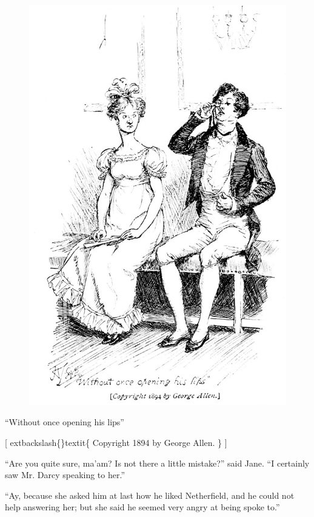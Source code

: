\documentclass[10pt]{book}
\begin{document}
\begin{figure}[h]
\centering
\includegraphics[width=\linewidth]{images/i_053.jpg}
\end{figure}

     “Without once opening his lips”
    

     [
     	extbackslash\{\}textit\{
      Copyright 1894 by George Allen.
     \}
     ]
    

   “Are you quite sure, ma’am? Is not there a little mistake?” said Jane.
“I certainly saw Mr. Darcy speaking to her.”
  

   “Ay, because she asked him at last how he liked
   Netherfield, and he
could not help answering her; but she said he seemed very angry at being
spoke to.”
  
\end{document}
